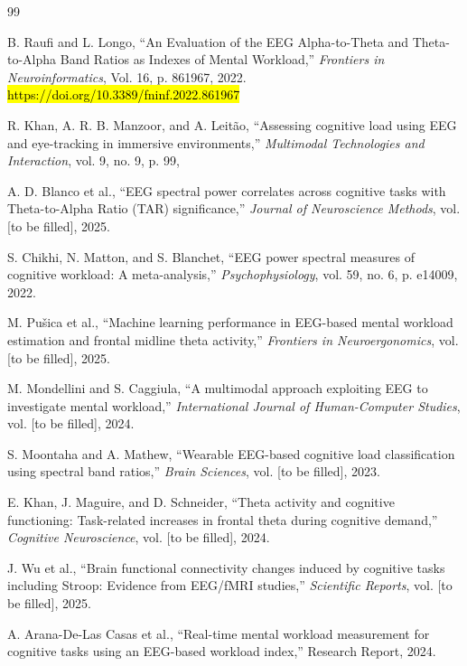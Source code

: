 \documentclass[letterpaper, 10 pt, conference]{ieeeconf}
\begin{document}
\begin{thebibliography}{99}

B. Raufi and L. Longo, ``An Evaluation of the EEG Alpha-to-Theta and Theta-to-Alpha Band Ratios as Indexes of Mental Workload,'' \emph{Frontiers in Neuroinformatics}, Vol. 16, p. 861967, 2022. \hl{https://doi.org/10.3389/fninf.2022.861967}

R. Khan, A. R. B. Manzoor, and A. Leitão, ``Assessing cognitive load using EEG and eye-tracking in immersive environments,'' \emph{Multimodal Technologies and Interaction}, vol. 9, no. 9, p. 99,  

A. D. Blanco et al., ``EEG spectral power correlates across cognitive tasks with Theta-to-Alpha Ratio (TAR) significance,'' \emph{Journal of Neuroscience Methods}, vol. [to be filled], 2025. 

S. Chikhi, N. Matton, and S. Blanchet, ``EEG power spectral measures of cognitive workload: A meta-analysis,'' \emph{Psychophysiology}, vol. 59, no. 6, p. e14009, 2022. 

M. Pušica et al., ``Machine learning performance in EEG-based mental workload estimation and frontal midline theta activity,'' \emph{Frontiers in Neuroergonomics}, vol. [to be filled], 2025. 

M. Mondellini and S. Caggiula, ``A multimodal approach exploiting EEG to investigate mental workload,'' \emph{International Journal of Human-Computer Studies}, vol. [to be filled], 2024. 

S. Moontaha and A. Mathew, ``Wearable EEG-based cognitive load classification using spectral band ratios,'' \emph{Brain Sciences}, vol. [to be filled], 2023. 

E. Khan, J. Maguire, and D. Schneider, ``Theta activity and cognitive functioning: Task-related increases in frontal theta during cognitive demand,'' \emph{Cognitive Neuroscience}, vol. [to be filled], 2024. 

J. Wu et al., ``Brain functional connectivity changes induced by cognitive tasks including Stroop: Evidence from EEG/fMRI studies,'' \emph{Scientific Reports}, vol. [to be filled], 2025. 

A. Arana-De-Las Casas et al., ``Real-time mental workload measurement for cognitive tasks using an EEG-based workload index,'' Research Report, 2024. 


\end{thebibliography}
\end{document}

